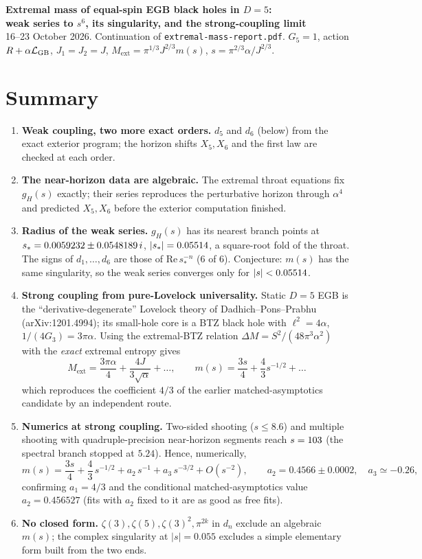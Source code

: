 \documentclass[10pt,a4paper]{article}
\newcommand{\ext}{\mathrm{ext}}
\begin{document}
{\Large\bfseries Extremal mass of equal-spin EGB black holes in $D=5$:\\[2pt]
weak series to $s^6$, its singularity, and the strong-coupling limit}\\[3pt]
{\small 16--23 October 2026. Continuation of \texttt{extremal-mass-report.pdf}.
$G_5=1$, action $R+\alpha\mathcal L_{\rm GB}$, $J_1=J_2=J$,
$M_\ext=\pi^{1/3}J^{2/3}m(s)$, $s=\pi^{2/3}\alpha/J^{2/3}$.}

\section*{Summary}
\begin{enumerate}
\item \textbf{Weak coupling, two more exact orders.} $d_5$ and $d_6$ (below) from the exact
exterior program; the horizon shifts $X_5,X_6$ and the first law are checked at each order.
\item \textbf{The near-horizon data are algebraic.} The extremal throat equations fix $g_H(s)$
exactly; their series reproduces the perturbative horizon through $\alpha^4$ and predicted
$X_5,X_6$ before the exterior computation finished.
\item \textbf{Radius of the weak series.} $g_H(s)$ has its nearest branch points at
$s_*=0.0059232\pm0.0548189\,i$, $|s_*|=0.05514$, a square-root fold of the throat.
The signs of $d_1,\dots,d_6$ are those of $\mathrm{Re}\,s_*^{-n}$ (6 of 6).
Conjecture: $m(s)$ has the same singularity, so the weak series converges only for $|s|<0.05514$.
\item \textbf{Strong coupling from pure-Lovelock universality.} Static $D=5$ EGB is the
``derivative-degenerate'' Lovelock theory of Dadhich--Pons--Prabhu (arXiv:1201.4994); its
small-hole core is a BTZ black hole with $\ell^2=4\alpha$, $1/(4G_3)=3\pi\alpha$. Using the
extremal-BTZ relation $\Delta M=S^2/(48\pi^3\alpha^2)$ with the \emph{exact} extremal entropy gives
\[ M_\ext=\frac{3\pi\alpha}{4}+\frac{4J}{3\sqrt\alpha}+\dots,\qquad
m(s)=\frac{3s}{4}+\frac43 s^{-1/2}+\dots \]
which reproduces the coefficient $4/3$ of the earlier matched-asymptotics candidate by an
independent route.
\item \textbf{Numerics at strong coupling.} Two-sided shooting ($s\le8.6$) and multiple shooting
with quadruple-precision near-horizon segments reach $s=103$ (the spectral branch stopped at
$5.24$). \StrongFitSentence{} Hence, numerically,
\[ m(s)=\frac{3s}{4}+\frac43\,s^{-1/2}+a_2\,s^{-1}+a_3\,s^{-3/2}+O(s^{-2}),\qquad
a_2=0.4566\pm0.0002,\quad a_3\simeq-0.26, \]
confirming $a_1=4/3$ and the conditional matched-asymptotics value $a_2=0.456527$
(fits with $a_2$ fixed to it are as good as free fits).
\item \textbf{No closed form.} $\zeta(3),\zeta(5),\zeta(3)^2,\pi^{2k}$ in $d_n$ exclude an algebraic
$m(s)$; the complex singularity at $|s|=0.055$ excludes a simple elementary form built from the
two ends. \GlobalFitSentence
\end{enumerate}
\end{document}
